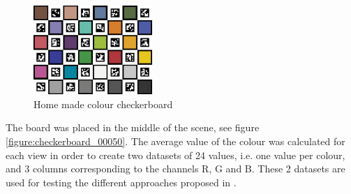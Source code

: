 \begin{figure}[H]
    \centering
    \includegraphics[width=0.40\textwidth]{images/visual_enhancement/colour/charuco24_color.png}
    \caption{Home made colour checkerboard}
    \label{figure:charuco24_color}
\end{figure}

The board was placed in the middle of the scene, see figure \ref{figure:checkerboard_00050}. The average value of the colour was calculated for each view in order to create two datasets of 24 values, i.e. one value per colour, and 3 columns corresponding to the channels R, G and B.
These 2 datasets are used for testing the different approaches proposed in \cite{ilie_ensuring_2005}.

